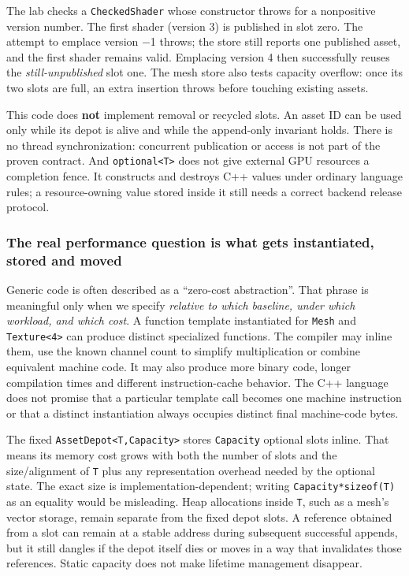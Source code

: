 The lab checks a \texttt{CheckedShader} whose constructor throws for a nonpositive version number. The first shader (version 3) is published in slot zero. The attempt to emplace version −1 throws; the store still reports one published asset, and the first shader remains valid. Emplacing version 4 then successfully reuses the \emph{still-unpublished} slot one. The mesh store also tests capacity overflow: once its two slots are full, an extra insertion throws before touching existing assets.

This code does \textbf{not} implement removal or recycled slots. An asset ID can be used only while its depot is alive and while the append-only invariant holds. There is no thread synchronization: concurrent publication or access is not part of the proven contract. And \texttt{optional\textless{}T\textgreater{}} does not give external GPU resources a completion fence. It constructs and destroys C++ values under ordinary language rules; a resource-owning value stored inside it still needs a correct backend release protocol.

\subsubsection{The real performance question is what gets instantiated, stored and moved}\label{the-real-performance-question-is-what-gets-instantiated-stored-and-moved}

Generic code is often described as a ``zero-cost abstraction''. That phrase is meaningful only when we specify \emph{relative to which baseline, under which workload, and which cost}. A function template instantiated for \texttt{Mesh} and \texttt{Texture\textless{}4\textgreater{}} can produce distinct specialized functions. The compiler may inline them, use the known channel count to simplify multiplication or combine equivalent machine code. It may also produce more binary code, longer compilation times and different instruction-cache behavior. The C++ language does not promise that a particular template call becomes one machine instruction or that a distinct instantiation always occupies distinct final machine-code bytes.

The fixed \texttt{AssetDepot\textless{}T,Capacity\textgreater{}} stores \texttt{Capacity} optional slots inline. That means its memory cost grows with both the number of slots and the size/alignment of \texttt{T} plus any representation overhead needed by the optional state. The exact size is implementation-dependent; writing \texttt{Capacity*sizeof(T)} as an equality would be misleading. Heap allocations inside \texttt{T}, such as a mesh's vector storage, remain separate from the fixed depot slots. A reference obtained from a slot can remain at a stable address during subsequent successful appends, but it still dangles if the depot itself dies or moves in a way that invalidates those references. Static capacity does not make lifetime management disappear.

